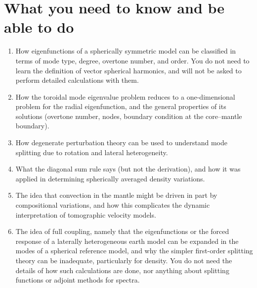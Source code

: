 \section*{What you need to know and be able to do}
\begin{enumerate}
    \item[(i)] How eigenfunctions of a spherically symmetric model can be classified in terms of mode type, degree, overtone number, and order. 
    You do not need to learn the definition of vector spherical harmonics, and will not be asked to perform detailed calculations with them.
    \item[(ii)] How the toroidal mode eigenvalue problem reduces to a one-dimensional problem for the radial eigenfunction, 
    and the general properties of its solutions (overtone number, nodes, boundary condition at the core--mantle boundary).
    \item[(iii)] How degenerate perturbation theory can be used to understand mode splitting due to rotation and lateral heterogeneity.     
    \item[(iv)] What the diagonal sum rule says (but not the derivation), and how it was applied in determining spherically averaged 
    density variations.
    \item[(v)] The idea that convection in the mantle might be driven in part by compositional variations, and how this complicates 
    the dynamic interpretation of tomographic velocity models.
    \item[(vi)] The idea of full coupling, namely that the eigenfunctions or the forced response of a laterally heterogeneous earth 
    model can be expanded in the modes of a spherical reference model, and why the simpler first-order splitting theory can be inadequate, 
    particularly for density. You do not need the details of how such calculations are done, nor anything about splitting 
    functions or adjoint methods for spectra.
\end{enumerate}
